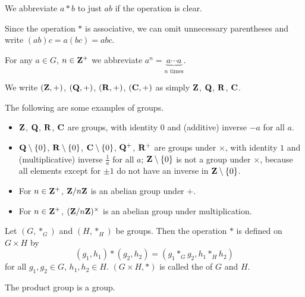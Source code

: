 \begin{notation}
We abbreviate $a\ast b$ to just $ab$ if the operation is clear.
\end{notation}

\begin{notation}
Since the operation $\ast$ is associative, we can omit unnecessary parentheses and write $(ab)c=a(bc)=abc$.
\end{notation}

\begin{notation}
For any $a\in G$, $n\in\mathbf Z^+$ we abbreviate $a^n=\underbrace{a\cdots a}_\text{$n$ times}$.
\end{notation}

\begin{notation}
We write $(\mathbf Z,+)$, $(\mathbf Q,+)$, $(\mathbf R,+)$, $(\mathbf C,+)$ as simply $\mathbf Z$, $\mathbf Q$, $\mathbf R$, $\mathbf C$.
\end{notation}

\begin{example}
The following are some examples of groups.
\begin{itemize}
\item $\mathbf Z$, $\mathbf Q$, $\mathbf R$, $\mathbf C$ are groups, with identity $0$ and (additive) inverse $-a$ for all $a$.
\item $\mathbf Q\setminus\{0\}$, $\mathbf R\setminus\{0\}$, $\mathbf C\setminus\{0\}$, $\mathbf Q^+$, $\mathbf R^+$ are groups under $\times$, with identity $1$ and (multiplicative) inverse $\frac{1}{a}$ for all $a$; $\mathbf Z\setminus\{0\}$ is not a group under $\times$, because all elements except for $\pm1$ do not have an inverse in $\mathbf Z\setminus\{0\}$.
\item For $n\in\mathbf Z^+$, $\mathbf Z/n\mathbf Z$ is an abelian group under $+$.
\item For $n\in\mathbf Z^+$, $(\mathbf Z/n\mathbf Z)^\times$ is an abelian group under multiplication.
\end{itemize}
\end{example}

\begin{definition}
Let $(G,\ast_G)$ and $(H,\ast_H)$ be groups. Then the operation $\ast$ is defined on $G\times H$ by
\[(g_1,h_1)\ast(g_2,h_2)=(g_1\ast_G g_2,h_1\ast_H h_2)\]
for all $g_1,g_2\in G$, $h_1,h_2\in H$. $(G\times H, \ast)$ is called the  of $G$ and $H$.
\end{definition}

\begin{proposition}
The product group is a group.
\end{proposition}
    
